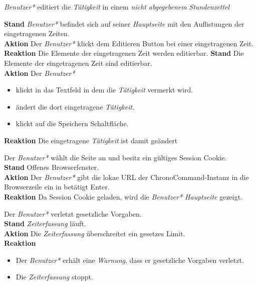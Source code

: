 \begin{requirements}
	 \emph{Benutzer*} editiert die \emph{Tätigkeit} in einem \emph{nicht abgegebenem} \emph{Stundenzettel}
	\begin{requirements}
	        \textbf{Stand} \emph{Benutzer*} befindet sich auf seiner \emph{Hauptseite} mit den Auflistungen der eingetragenen Zeiten. \\
	        \textbf{Aktion} Der \emph{Benutzer*} klickt dem Editieren Button bei einer eingetragenen Zeit.\\
            \textbf{Reaktion} Die Elemente der eingetragenen Zeit werden editierbar.
        \textbf{Stand} Die Elemente der eingetragenen Zeit sind editierbar. \\
        \textbf{Aktion} Der \emph{Benutzer*}
            \begin{itemize}
                \item klickt in das Textfeld in dem die \emph{Tätigkeit} vermerkt wird.
                \item ändert die dort eingetragene \emph{Tätigkeit}.
                \item klickt auf die Speichern Schaltfläche.
            \end{itemize}
            \textbf{Reaktion} Die eingetragene \emph{Tätigkeit} ist damit geändert
    \end{requirements}

     Der \emph{Benutzer*} wählt die Seite an und besitz ein gültiges Session Cookie. \\
        \textbf{Stand} Offenes Browserfenster. \\
        \textbf{Aktion} Der \emph{Benutzer*} gibt die lokae URL der ChronoCommand-Instanz in die Browserzeile ein in betätigt Enter. \\
        \textbf{Reaktion} Da Session Cookie geladen, wird die \emph{Benutzer* Hauptseite} gezeigt.

     Der \emph{Benutzer*} verletzt gesetzliche Vorgaben. \\
        \textbf{Stand} \emph{Zeiterfassung} läuft. \\
        \textbf{Aktion} Die \emph{Zeiterfassung} überschreitet ein gesetzes Limit. \\
        \textbf{Reaktion}
            \begin{itemize}
                \item Der \emph{Benutzer*} erhält eine \emph{Warnung}, dass er gesetzliche Vorgaben verletzt.
                \item Die \emph{Zeiterfassung} stoppt.
            \end{itemize}


\end{requirements}
